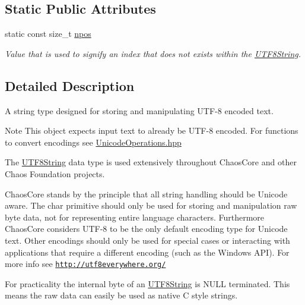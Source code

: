 \subsection*{Static Public Attributes}
\begin{DoxyCompactItemize}
\item 
\hypertarget{classchaos_1_1uni_1_1_u_t_f8_string_aa2e80695ce3d315ca62449e0a835b6a6}{static const size\-\_\-t \hyperlink{classchaos_1_1uni_1_1_u_t_f8_string_aa2e80695ce3d315ca62449e0a835b6a6}{npos}}\label{classchaos_1_1uni_1_1_u_t_f8_string_aa2e80695ce3d315ca62449e0a835b6a6}

\begin{DoxyCompactList}\small\item\em Value that is used to signify an index that does not exists within the \hyperlink{classchaos_1_1uni_1_1_u_t_f8_string}{U\-T\-F8\-String}. \end{DoxyCompactList}\end{DoxyCompactItemize}


\subsection{Detailed Description}
A string type designed for storing and manipulating U\-T\-F-\/8 encoded text. 

\begin{DoxyNote}{Note}
This object expects input text to already be U\-T\-F-\/8 encoded. For functions to convert encodings see \hyperlink{_unicode_operations_8hpp}{Unicode\-Operations.\-hpp}
\end{DoxyNote}
The \hyperlink{classchaos_1_1uni_1_1_u_t_f8_string}{U\-T\-F8\-String} data type is used extensively throughout Chaos\-Core and other Chaos Foundation projects.

Chaos\-Core stands by the principle that all string handling should be Unicode aware. The {\ttfamily char} primitive should only be used for storing and manipulation raw byte data, not for representing entire language characters. Furthermore Chaos\-Core considers U\-T\-F-\/8 to be the only default encoding type for Unicode text. Other encodings should only be used for special cases or interacting with applications that require a different encoding (such as the Windows A\-P\-I). For more info see \href{http://utf8everywhere.org/}{\tt http\-://utf8everywhere.\-org/}

For practicality the internal byte of an \hyperlink{classchaos_1_1uni_1_1_u_t_f8_string}{U\-T\-F8\-String} is N\-U\-L\-L terminated. This means the raw data can easily be used as native C style strings.

